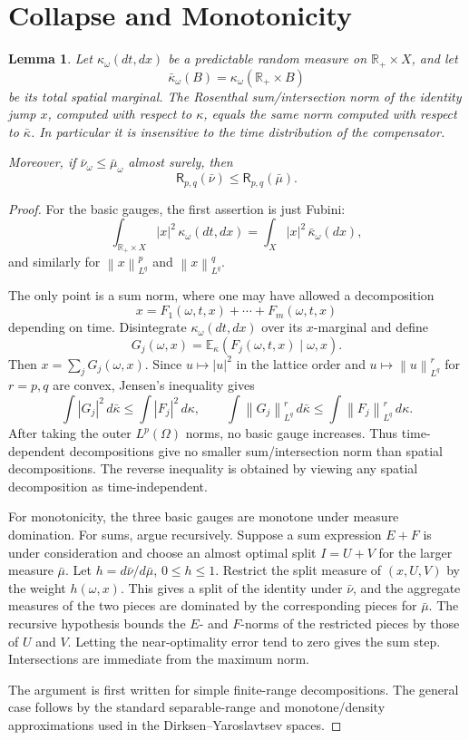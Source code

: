 \documentclass[11pt]{article}
\newtheorem{lemma}{Lemma}
\newcommand{\E}{\mathbb E}
\newcommand{\R}{\mathbb R}
\newcommand{\norm}[1]{\left\lVert #1\right\rVert}
\begin{document}
\section*{Collapse and Monotonicity}

\begin{lemma}\label{lem:collapse}
Let \(\kappa_\omega(dt,dx)\) be a predictable random measure on
\(\R_+\times X\), and let
\[
  \bar\kappa_\omega(B)=\kappa_\omega(\R_+\times B)
\]
be its total spatial marginal.  The Rosenthal sum/intersection norm of the
identity jump \(x\), computed with respect to \(\kappa\), equals the same norm
computed with respect to \(\bar\kappa\).  In particular it is insensitive to
the time distribution of the compensator.

Moreover, if \(\bar\nu_\omega\le \bar\mu_\omega\) almost surely, then
\[
  \mathsf R_{p,q}(\bar\nu)\le \mathsf R_{p,q}(\bar\mu).
\]
\end{lemma}

\begin{proof}
For the basic gauges, the first assertion is just Fubini:
\[
  \int_{\R_+\times X}|x|^2\,\kappa_\omega(dt,dx)
  =
  \int_X |x|^2\,\bar\kappa_\omega(dx),
\]
and similarly for \(\norm{x}_{L^q}^p\) and \(\norm{x}_{L^q}^q\).

The only point is a sum norm, where one may have allowed a decomposition
\[
   x=F_1(\omega,t,x)+\cdots+F_m(\omega,t,x)
\]
depending on time.  Disintegrate \(\kappa_\omega(dt,dx)\) over its
\(x\)-marginal and define
\[
   G_j(\omega,x)=\E_\kappa(F_j(\omega,t,x)\mid \omega,x).
\]
Then \(x=\sum_j G_j(\omega,x)\).  Since \(u\mapsto |u|^2\) in the lattice
order and \(u\mapsto\norm{u}_{L^q}^r\) for \(r=p,q\) are convex, Jensen's
inequality gives
\[
 \int |G_j|^2\,d\bar\kappa\le \int |F_j|^2\,d\kappa,\qquad
 \int \norm{G_j}_{L^q}^r\,d\bar\kappa\le
 \int \norm{F_j}_{L^q}^r\,d\kappa .
\]
After taking the outer \(L^p(\Omega)\) norms, no basic gauge increases.  Thus
time-dependent decompositions give no smaller sum/intersection norm than
spatial decompositions.  The reverse inequality is obtained by viewing any
spatial decomposition as time-independent.

For monotonicity, the three basic gauges are monotone under measure domination.
For sums, argue recursively.  Suppose a sum expression \(E+F\) is under
consideration and choose an almost optimal split \(I=U+V\) for the larger
measure \(\bar\mu\).  Let \(h=d\bar\nu/d\bar\mu\), \(0\le h\le1\).  Restrict
the split measure of \((x,U,V)\) by the weight \(h(\omega,x)\).  This gives a
split of the identity under \(\bar\nu\), and the aggregate measures of the two
pieces are dominated by the corresponding pieces for \(\bar\mu\).  The
recursive hypothesis bounds the \(E\)- and \(F\)-norms of the restricted
pieces by those of \(U\) and \(V\).  Letting the near-optimality error tend to
zero gives the sum step.  Intersections are immediate from the maximum norm.

The argument is first written for simple finite-range decompositions.  The
general case follows by the standard separable-range and monotone/density
approximations used in the Dirksen--Yaroslavtsev spaces.
\end{proof}
\end{document}
